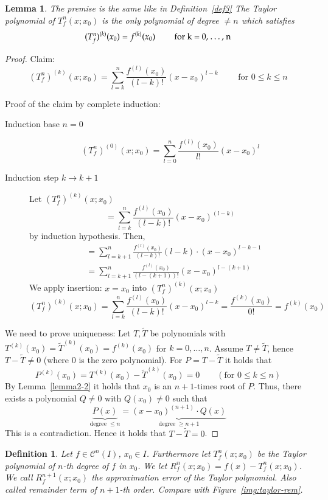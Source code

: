 \documentclass{article}
\newtheorem{definition}{Definition}  \numberwithin{definition}{section}
\newtheorem{lemma}{Lemma}  \numberwithin{lemma}{section}
\begin{document}
\begin{lemma}
  The premise is the same like in Definition~\ref{def3}
  The Taylor polynomial of $T_f^n(x; x_0)$ is the only polynomial of degree $\neq n$ which satisfies
  \[ (T_f^n)^{(k)}(x_0) = f^{(k)}(x_0) \qquad \text{ for k = 0, \dots, n} \]
\end{lemma}

\begin{proof}
  Claim:
  \[ (T_f^n)^{(k)}(x; x_0) = \sum_{l=k}^n \frac{f^{(l)}(x_0)}{(l - k)!} (x - x_0)^{l-k} \qquad \text{ for } 0 \leq k \leq n \]

  Proof of the claim by complete induction:
  \begin{description}
    \item[Induction base $n = 0$] 
      \[ (T_f^n)^{(0)} (x; x_0) = \sum_{l=0}^n \frac{f^{(l)}(x_0)}{l!} (x - x_0)^l \]
    \item[Induction step $k \to k + 1$]
      Let $(T_f^n)^{(k)}(x; x_0)$
      \[ = \sum_{l=k}^{n} \frac{f^{(l)}(x_0)}{(l - k)!} (x - x_0)^{(l-k)} \]
      by induction hypothesis. Then,
      \begin{align*}
        &= \sum_{l=k+1}^n \frac{f^{(l)}(x_0)}{(l-k)!} (l - k) \cdot (x - x_0)^{l - k - 1} \\
        &= \sum_{l=k+1}^n \frac{f^{(l)}(x_0)}{(l - (k+1))!} (x - x_0)^{l - (k+1)}
      \end{align*}
      We apply insertion: $x = x_0$ into $(T_f^n)^{(k)}(x; x_0)$
      \[ (T_f^n)^{(k)}(x; x_0) = \sum_{l=k}^n \frac{f^{(l)}(x_0)}{(l - k)!} (x - x_0)^{l-k} = \frac{f^{(k)}(x_0)}{0!} = f^{(k)}(x_0) \]
  \end{description}

  We need to prove uniqueness: Let $T, \tilde T$ be polynomials with $T^{(k)}(x_0) = \tilde T^{(k)}(x_0) = f^{(k)}(x_0)$ for $k = 0, \dots, n$.
  Assume $T \neq \tilde T$, hence $T - \tilde T \neq 0$ (where $0$ is the zero polynomial).
  For $P = T - \tilde T$ it holds that
  \[ P^{(k)}(x_0) = T^{(k)}(x_0) - \tilde T^{(k)}(x_0) = 0 \qquad (\text{for } 0 \leq k \leq n) \]
  By Lemma~\ref{lemma2-2} it holds that $x_0$ is an $n+1$-times root of $P$. Thus, there exists a polynomial $Q \neq 0$ with $Q(x_0) \neq 0$ such that
  \[ \underbrace{P(x)}_{\text{degree } \leq n} = \underbrace{(x - x_0)^{(n+1)} \cdot Q(x)}_{\text{degree } \geq n+1} \]
  This is a contradiction. Hence it holds that $T - \tilde T = 0$.
\end{proof}

\begin{definition} %
  \label{def4}
  Let $f \in \mathcal C^n(I)$, $x_0 \in I$. Furthermore let $T_f^n(x; x_0)$ be the Taylor polynomial of $n$-th degree of $f$ in $x_0$.
  We let $R_f^n(x; x_0) = f(x) - T_f^n(x; x_0)$. We call $R_f^{n+1}(x; x_0)$ the \emph{approximation error} of the Taylor polynomial.
  Also called \emph{remainder term of $n+1$-th order}. Compare with Figure~\ref{img:taylor-rem}.
\end{definition}
\end{document}
